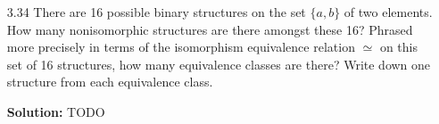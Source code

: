 \begin{enumerate}
      \textbf{Proof:}
      \begin{enumerate}
         \item The map $\phi : \cyc{\C, +} \rightarrow \cyc{H, +}$, defined by
               $\phi(a + bi) = \left[
               \begin{tabular}{@{}l r@{}} 
                  $a$ & $-b$ \\ 
                  $b$ & $a$
               \end{tabular}\right]$ is a bijection and a homomorphism.
         \item The map $\phi : \cyc{\C, \cdot} \rightarrow \cyc{H, \cdot}$, 
               defined by $\phi(a + bi) = \left[
               \begin{tabular}{@{}l r@{}} 
                  $a$ & $-b$ \\ 
                  $b$ & $a$
               \end{tabular}\right]$ is a bijection and a homomorphism.
      \end{enumerate}
   \item[3.34] There are 16 possible binary structures on the set $\{a, b\}$ of
               two elements. How many nonisomorphic structures are there amongst
               these 16? Phrased more precisely in terms of the isomorphism
               equivalence relation $\simeq$ on this set of 16 structures, how
               many equivalence classes are there? Write down one structure from
               each equivalence class.

      \textbf{Solution:} TODO
\end{enumerate}
